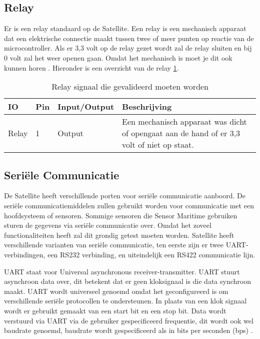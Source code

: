 \subsection{Relay}
Er is een relay standaard op de Satellite. Een relay is een mechanisch apparaat dat een elektrische connectie maakt tussen twee of meer punten op reactie van de microcontroller. Als er 3,3 volt op de relay gezet wordt zal de relay sluiten en bij 0 volt zal het weer openen gaan. Omdat het mechanisch is moet je dit ook kunnen horen \autocite{relay}. Hieronder is een overzicht van de relay \ref{tab:hw_val_relay}.

\begin{table}[h!]
	\caption{Relay signaal die gevalideerd moeten worden}
	\begin{tabular}{lllp{12cm}}
	\toprule
	\textbf{IO} & \textbf{Pin} & \textbf{Input/Output} & \textbf{Beschrijving}			\\ \toprule
	Relay		& 1   	& Output		& Een mechanisch apparaat was dicht of opengaat aan de hand of er 3,3 volt of niet op staat.	\\ \bottomrule
	\end{tabular}
	\label{tab:hw_val_relay}
\end{table}

\subsection{Seriële Communicatie}
De Satellite heeft verschillende porten voor seriële communicatie aanboord. De seriële communicatiemiddelen zullen gebruikt worden voor communicatie met een hoofdsysteem of sensoren. Sommige sensoren die Sensor Maritime gebruiken sturen de gegevens via seriële communicatie over. Omdat het zoveel functionaliteiten heeft zal dit grondig getest moeten worden. Satellite heeft verschillende varianten van seriële communicatie, ten eerste zijn er twee UART-verbindingen, een RS232 verbinding, en uiteindelijk een RS422 communicatie lijn. \newline

\noindent UART staat voor Universal asynchronous receiver-transmitter. UART stuurt asynchroon data over, dit betekent dat er geen kloksignaal is die data synchroon maakt. UART wordt universeel genoemd omdat het geconfigureerd is om verschillende seriële protocollen te ondersteunen. In plaats van een klok signaal wordt er gebruikt gemaakt van een start bit en een stop bit. Data wordt verstuurd via UART via de gebruiker gespecificeerd frequentie, dit wordt ook wel baudrate genoemd, baudrate wordt gespecificeerd als in bits per seconden (bps) \autocite{UART}. \newline

